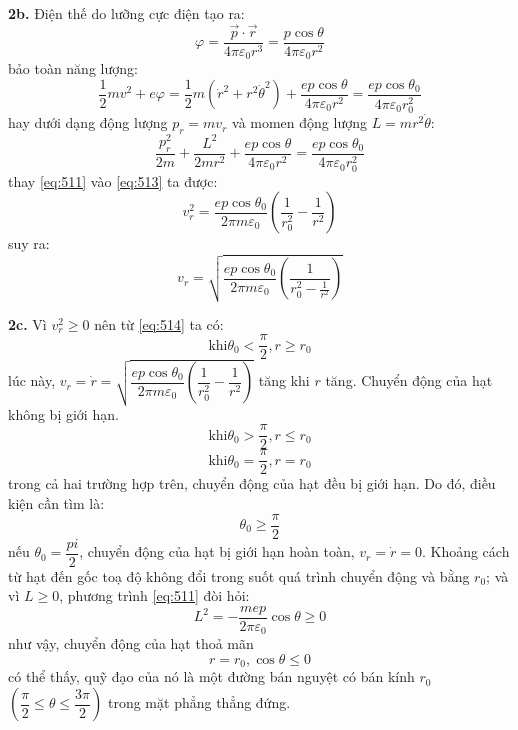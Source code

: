 \noindent\textbf{2b.} Điện thế do lưỡng cực điện tạo ra:
\begin{equation*}
  \varphi=\frac{\vec{p}\cdot\vec{r}}{4\pi\varepsilon_{0}r^{3}}=\frac{p\cos\theta}{4\pi\varepsilon_{0}r^{2}}
\end{equation*}
bảo toàn năng lượng:
\begin{equation}
  \label{eq:512}
  \frac{1}{2}mv^{2}+e\varphi=\frac{1}{2}m(\dot{r}^{2}+r^{2}\dot{\theta}^{2})+\frac{ep\cos\theta}{4\pi\varepsilon_{0}r^{2}}=\frac{ep\cos\theta_{0}}{4\pi\varepsilon_{0}r_{0}^{2}}
\end{equation}
hay dưới dạng động lượng $p_{r}=mv_{r}$ và momen động lượng $L=mr^{2}\dot{\theta}$:
\begin{equation}
  \label{eq:513}
  \frac{p_{r}^{2}}{2m}+\frac{L^{2}}{2mr^{2}}+\frac{ep\cos\theta}{4\pi\varepsilon_{0}r^{2}}=\frac{ep\cos\theta_{0}}{4\pi\varepsilon_{0}r_{0}^{2}}
\end{equation}
thay \eqref{eq:511} vào \eqref{eq:513} ta được:
\begin{equation*}
  v_{r}^{2}=\frac{ep\cos\theta_{0}}{2\pi m\varepsilon_{0}}\left(\frac{1}{r_{0}^{2}}-\frac{1}{r^{2}}\right)
\end{equation*}
suy ra:
\begin{equation}
  \label{eq:514}
  v_{r}=\sqrt{\frac{ep\cos\theta_{0}}{2\pi m\varepsilon_{0}}\left(\frac{1}{r_{0}^{2}-\frac{1}{r^{2}}}\right)}
\end{equation}

\noindent\textbf{2c.} Vì $v_{r}^{2}\geqslant 0$ nên từ \eqref{eq:514} ta có:
\begin{equation*}
  \text{khi}\theta_{0}<\frac{\pi}{2}, r\geqslant r_{0}
\end{equation*}
lúc này, $v_{r}=\dot{r}=\sqrt{\dfrac{ep\cos\theta_{0}}{2\pi m\varepsilon_{0}}\left(\dfrac{1}{r_{0}^{2}}-\dfrac{1}{r^{2}}\right)}$ tăng khi $r$ tăng. Chuyển động của hạt không bị giới hạn.
\begin{equation*}
  \text{khi}\theta_{0}>\frac{\pi}{2}, r\leqslant r_{0}
\end{equation*}
\begin{equation*}
  \text{khi}\theta_{0}=\frac{\pi}{2}, r=r_{0}
\end{equation*}
trong cả hai trường hợp trên, chuyển động của hạt đều bị giới hạn. Do đó, điều kiện cần tìm là:
\begin{equation}
  \label{eq:515}
  \theta_{0}\geqslant\frac{\pi}{2}
\end{equation}
nếu $\theta_{0}=\dfrac{pi}{2}$, chuyển động của hạt bị giới hạn hoàn toàn, $v_{r}=\dot{r}=0$. Khoảng cách từ hạt đến gốc toạ độ không đổi trong suốt quá trình chuyển động và bằng $r_{0}$; và vì $L\geqslant 0$, phương trình \eqref{eq:511} đòi hỏi:
\begin{equation}
  \label{eq:516}
  L^{2}=-\frac{mep}{2\pi\varepsilon_{0}}\cos\theta\geqslant 0
\end{equation}
như vậy, chuyển động của hạt thoả mãn
\begin{equation}
  \label{eq:517}
  r=r_{0}, \cos\theta\leqslant 0
\end{equation}
có thể thấy, quỹ đạo của nó là một đường bán nguyệt có bán kính $r_{0}$ $\left(\dfrac{\pi}{2}\leqslant\theta\leqslant\dfrac{3\pi}{2}\right)$ trong mặt phẳng thẳng đứng.

